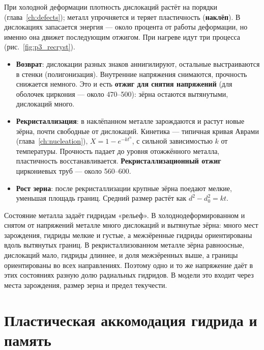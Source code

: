 При холодной деформации плотность дислокаций растёт на порядки (глава~\ref{ch:defects}); металл упрочняется и
теряет пластичность (\textbf{наклёп}). В дислокациях запасается энергия --- около процента от работы деформации, но
именно она движет последующим отжигом. При нагреве идут три процесса (рис.~\ref{fig:p3_recryst}).
\begin{itemize}
\item \textbf{Возврат}: дислокации разных знаков аннигилируют, остальные выстраиваются в стенки (полигонизация).
  Внутренние напряжения снимаются, прочность снижается немного. Это и есть \textbf{отжиг для снятия напряжений} (для
  оболочек циркония --- около 470--500\degC): зёрна остаются вытянутыми, дислокаций много.
\item \textbf{Рекристаллизация}: в наклёпанном металле зарождаются и растут новые зёрна, почти свободные от
  дислокаций. Кинетика --- типичная кривая Аврами (глава~\ref{ch:nucleation}), $X = 1 - e^{-kt^n}$, с сильной
  зависимостью $k$ от температуры. Прочность падает до уровня отожжённого металла, пластичность восстанавливается.
  \textbf{Рекристаллизационный отжиг} циркониевых труб --- около 560--600\degC.
\item \textbf{Рост зерна}: после рекристаллизации крупные зёрна поедают мелкие, уменьшая площадь границ. Средний
  размер растёт как $d^2 - d_0^2 = kt$.
\end{itemize}


\begin{zrbox}
Состояние металла задаёт гидридам «рельеф». В холоднодеформированном и снятом от напряжений металле много
дислокаций и вытянутые зёрна: много мест зарождения, гидриды мелкие и густые, а межзёренные гидриды ориентированы
вдоль вытянутых границ. В рекристаллизованном металле зёрна равноосные, дислокаций мало, гидриды длиннее, и доля
межзёренных выше, а границы ориентированы во всех направлениях. Поэтому одно и то же напряжение даёт в этих
состояниях разную долю радиальных гидридов. В модели это входит через места зарождения, размер зерна и предел
текучести.
\end{zrbox}

\section{Пластическая аккомодация гидрида и память}

